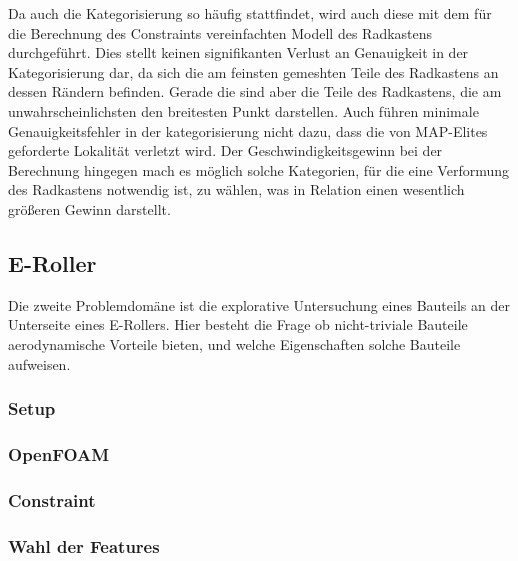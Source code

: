 Da auch die Kategorisierung so häufig stattfindet, wird auch diese mit dem für die Berechnung des Constraints vereinfachten Modell des Radkastens durchgeführt. 
Dies stellt keinen signifikanten Verlust an Genauigkeit in der Kategorisierung dar, da sich die am feinsten gemeshten Teile des Radkastens an dessen Rändern befinden.
Gerade die sind aber die Teile des Radkastens, die am unwahrscheinlichsten den breitesten Punkt darstellen.
Auch führen minimale Genauigkeitsfehler in der kategorisierung nicht dazu, dass die von MAP-Elites geforderte Lokalität verletzt wird.
Der Geschwindigkeitsgewinn bei der Berechnung hingegen mach es möglich solche Kategorien, für die eine Verformung des Radkastens notwendig ist, zu wählen, was in Relation einen wesentlich größeren Gewinn darstellt.

\subsection{E-Roller}


Die zweite Problemdomäne ist die explorative Untersuchung eines Bauteils an der Unterseite eines E-Rollers.
Hier besteht die Frage ob nicht-triviale Bauteile aerodynamische Vorteile bieten, und welche Eigenschaften solche Bauteile aufweisen.

\subsubsection{Setup}
\subsubsection{OpenFOAM}
\subsubsection{Constraint}
\subsubsection{Wahl der Features}





